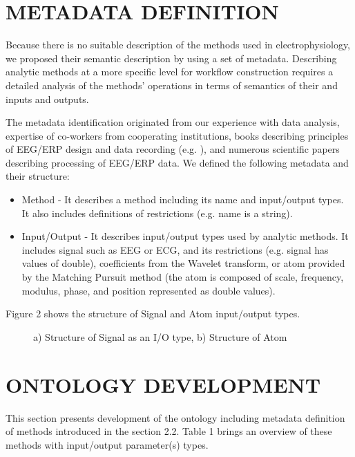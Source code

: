 \documentclass[a4paper,twoside]{article}
\begin{document}
\section{\uppercase{Metadata Definition}}

\noindent Because there is no suitable description of the methods used in electrophysiology, we proposed their semantic description by using a set of metadata. Describing analytic methods at a more specific level for workflow construction requires a detailed analysis of the methods' operations in terms of semantics of their and inputs and outputs.

The metadata identification originated from our experience with data analysis, expertise of co-workers from cooperating institutions, books describing principles of EEG/ERP design and data recording (e.g. \cite{Luck05}), and numerous scientific papers describing processing of EEG/ERP data. We defined the following metadata and their structure:
\begin{itemize}
	\item Method - It describes a method including its name and input/output types. It also includes definitions of restrictions (e.g. name is a string).
	
	\item Input/Output - It describes input/output types used by analytic methods. It includes signal such as EEG or ECG, and its restrictions (e.g. signal has values of double), coefficients from the Wavelet transform, or atom provided by the Matching Pursuit method (the atom is composed of scale, frequency, modulus, phase, and position represented as double values).
	
\end{itemize}

Figure 2 shows the structure of Signal and Atom input/output types.

\begin{figure}[!h]

  \centering
   {}
  \caption{a) Structure of Signal as an I/O type, b) Structure of Atom }
  \label{fig:SignalAndAtom}
 \end{figure}


\section{\uppercase{Ontology Development}}

\noindent This section presents development of the ontology including metadata definition of methods introduced in the section 2.2. Table 1 brings an overview of these methods with input/output parameter(s) types.
\end{document}
